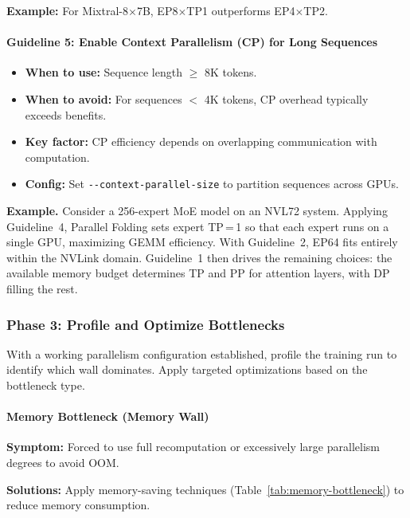 \documentclass[10pt,logo,copyright]{nvidiatechreport}
\begin{document}
\noindent\textbf{Example:} For Mixtral-8$\times$7B, EP8$\times$TP1 outperforms EP4$\times$TP2.

\paragraph*{Guideline 5: Enable Context Parallelism (CP) for Long Sequences}
\begin{itemize}
    \item \textbf{When to use:} Sequence length $\geq$ 8K tokens.
    \item \textbf{When to avoid:} For sequences $<$ 4K tokens, CP overhead typically exceeds benefits.
    \item \textbf{Key factor:} CP efficiency depends on overlapping communication with computation.
    \item \textbf{Config:} Set \texttt{-{}-context-parallel-size} to partition sequences across GPUs.
\end{itemize}

\noindent\textbf{Example.} Consider a 256-expert MoE model on an NVL72 system. Applying Guideline~4, Parallel Folding sets expert TP\,=\,1 so that each expert runs on a single GPU, maximizing GEMM efficiency. With Guideline~2, EP64 fits entirely within the NVLink domain. Guideline~1 then drives the remaining choices: the available memory budget determines TP and PP for attention layers, with DP filling the rest.

\subsubsection{Phase 3: Profile and Optimize Bottlenecks}

With a working parallelism configuration established, profile the training run to identify which wall dominates. Apply targeted optimizations based on the bottleneck type.

\paragraph*{Memory Bottleneck (Memory Wall)}
\textbf{Symptom:} Forced to use full recomputation or excessively large parallelism degrees to avoid OOM.

\noindent\textbf{Solutions:} Apply memory-saving techniques (Table~\ref{tab:memory-bottleneck}) to reduce memory consumption.
\end{document}
